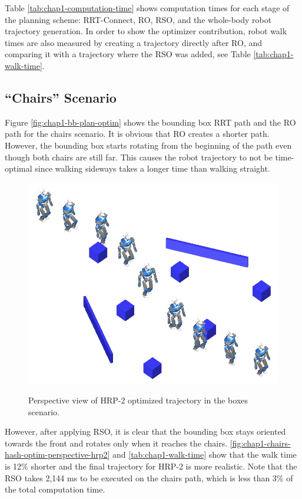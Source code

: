 Table \ref{tab:chap1-computation-time} shows computation times for
each stage of the planning scheme: RRT-Connect, RO, RSO, and the
whole-body robot trajectory generation. In order to show the optimizer
contribution, robot walk times are also measured by creating a
trajectory directly after RO, and comparing it with a trajectory where
the RSO was added, see Table \ref{tab:chap1-walk-time}.

\subsection{``Chairs'' Scenario}
\label{subsec:chap1-chairs}

Figure \ref{fig:chap1-bb-plan-optim} shows the bounding box RRT path
and the RO path for the chairs scenario. It is obvious that RO creates
a shorter path. However, the bounding box starts rotating from the
beginning of the path even though both chairs are still far. This
causes the robot trajectory to not be time-optimal since walking
sideways takes a longer time than walking straight.

\begin{figure}
  \centering
      {\includegraphics[width = 0.8\linewidth]
        {src/chap1-path-optimization/galton-hash-optim-perspective-hrp2.png}}
      \caption[HRP-2 optimized trajectory in the boxes
        scenario.]{Perspective view of HRP-2 optimized trajectory in
        the boxes scenario.}
      \label{fig:chap1-galton-hash-optim-perspective-hrp2}
\end{figure}

However, after applying RSO, it is clear that the bounding box stays
oriented towards the front and rotates only when it reaches the
chairs. \autoref{fig:chap1-chairs-hash-optim-perspective-hrp2} and
\autoref{tab:chap1-walk-time} show that the walk time is 12\% shorter
and the final trajectory for HRP-2 is more realistic. Note that the
RSO takes 2,144 ms to be executed on the chairs path, which is less
than 3\% of the total computation time.


